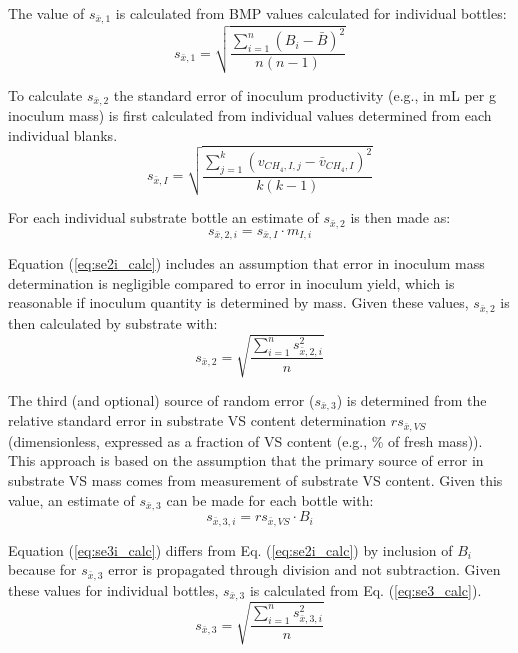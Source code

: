 \documentclass[]{article}
\begin{document}
The value of $s_{\bar{x},1}$ is calculated from BMP values calculated for individual bottles: 
\begin{equation}
  \label{eq:se1_calc}
  s_{\bar{x},1} = \sqrt{ \frac{\sum_{i=1} ^n(B_i - \bar{B})^2} {n(n - 1)} }
\end{equation}

To calculate $s_{\bar{x},2}$ the standard error of inoculum  productivity (e.g., in mL per g inoculum mass) is first calculated from individual values determined from each individual blanks. 
\begin{equation}
  \label{eq:seI_calc}
  s_{\bar{x},I} = \sqrt{\frac{\sum_{j=1} ^k (v_{CH_4, I, j} - \bar{v}_{CH_4, I})^2} {k(k -1)} }
\end{equation}

For each individual substrate bottle an estimate of $s_{\bar{x},2}$ is then made as:
\begin{equation}
  \label{eq:se2i_calc}
  s_{\bar{x},2,i} = s_{\bar{x},I} \cdot m_{I, i} 
\end{equation}

Equation (\ref{eq:se2i_calc}) includes an assumption that error in inoculum mass determination is negligible compared to error in inoculum  yield, which is reasonable if inoculum quantity is determined by mass. 
Given these values, $s_{\bar{x},2}$ is then calculated by substrate with:
\begin{equation}
  \label{eq:se2_calc}
  s_{\bar{x},2} = \sqrt{\frac{\sum_{i=1} ^n s_{\bar{x},2,i}^2} {n}}
\end{equation}

The third (and optional) source of random error ($s_{\bar{x},3}$) is determined from the relative standard error in substrate VS content determination $rs_{\bar{x},VS}$ (dimensionless, expressed as a fraction of VS content (e.g., \% of fresh mass)).
This approach is based on the assumption that the primary source of error in substrate VS mass comes from measurement of substrate VS content. 
Given this value, an estimate of $s_{\bar{x},3}$ can be made for each bottle with:
\begin{equation}
  \label{eq:se3i_calc}
  s_{\bar{x},3,i} = rs_{\bar{x},VS} \cdot B_{i}
\end{equation}

Equation (\ref{eq:se3i_calc}) differs from Eq. (\ref{eq:se2i_calc}) by inclusion of $B_{i}$ because for $s_{\bar{x},3}$ error is propagated through division and not subtraction. 
Given these values for individual bottles, $s_{\bar{x},3}$ is calculated from Eq. (\ref{eq:se3_calc}).
\begin{equation}
  \label{eq:se3_calc}
  s_{\bar{x},3} = \sqrt{\frac{\sum_{i=1} ^n s_{\bar{x},3,i}^2} {n}}
\end{equation}
\end{document}
